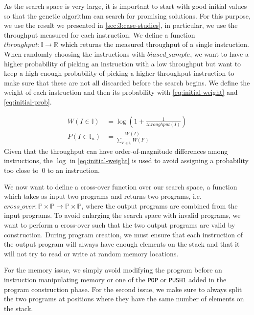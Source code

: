   As the search space is very large, it is important to start with good initial values so that the genetic algorithm can search for promising solutions. For this purpose, we use the result we presented in \autoref{sec:3:case-studies}, in particular, we use the throughput measured for each instruction. We define a function $throughput : \mathbb{I} \rightarrow \mathbb{R}$ which returns the measured throughput of a single instruction. When randomly choosing the instructions with $biased\_sample$, we want to have a higher probability of picking an instruction with a low throughput but want to keep a high enough probability of picking a higher throughput instruction to make sure that these are not all discarded before the search begins. We define the weight of each instruction and then its probability with \autoref{eq:initial-weight} and \autoref{eq:initial-prob}.

  \begin{align}
    \label{eq:initial-weight}
    W(I\in \mathbb{I})   & = \log\left(1 + \frac{1}{throughput(I)}\right) \\
    \label{eq:initial-prob}
    P(I\in \mathbb{I}_n) & = \frac{W(I)}{\sum_{I'\in \mathbb{I}_n}W(I')}
  \end{align}
  Given that the throughput can have order-of-magnitude differences among instructions, the $\log$ in \autoref{eq:initial-weight} is used to avoid assigning a probability too close to~$0$ to an instruction.

  We now want to define a cross-over function over our search space, a function which takes as input two programs and returns two programs, i.e. $cross\_over : \mathbb{P} \times \mathbb{P} \rightarrow \mathbb{P} \times \mathbb{P}$, where the output programs are combined from the input programs. To avoid enlarging the search space with invalid programs, we want to perform a cross-over such that the two output programs are valid by construction.
  During program creation, we must ensure that each instruction of the output program will always have enough elements on the stack and that it will not try to read or write at random memory locations.

  For the memory issue, we simply avoid modifying the program before an instruction manipulating memory or one of the \lstinline{POP} or \lstinline{PUSH1} added in the program construction phase. For the second issue, we make sure to always split the two programs at positions where they have the same number of elements on the stack.

